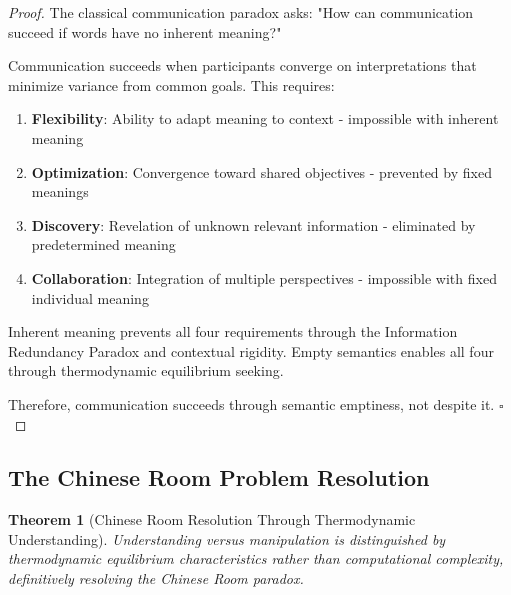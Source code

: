 \documentclass[11pt,a4paper]{article}
\newtheorem{theorem}{Theorem}[section]
\begin{document}
\begin{proof}
The classical communication paradox asks: "How can communication succeed if words have no inherent meaning?"

Communication succeeds when participants converge on interpretations that minimize variance from common goals. This requires:
\begin{enumerate}
\item \textbf{Flexibility}: Ability to adapt meaning to context - impossible with inherent meaning
\item \textbf{Optimization}: Convergence toward shared objectives - prevented by fixed meanings
\item \textbf{Discovery}: Revelation of unknown relevant information - eliminated by predetermined meaning
\item \textbf{Collaboration}: Integration of multiple perspectives - impossible with fixed individual meaning
\end{enumerate}

Inherent meaning prevents all four requirements through the Information Redundancy Paradox and contextual rigidity. Empty semantics enables all four through thermodynamic equilibrium seeking.

Therefore, communication succeeds through semantic emptiness, not despite it. $\square$
\end{proof}

\subsection{The Chinese Room Problem Resolution}

\begin{theorem}[Chinese Room Resolution Through Thermodynamic Understanding]
Understanding versus manipulation is distinguished by thermodynamic equilibrium characteristics rather than computational complexity, definitively resolving the Chinese Room paradox.
\end{theorem}
\end{document}
